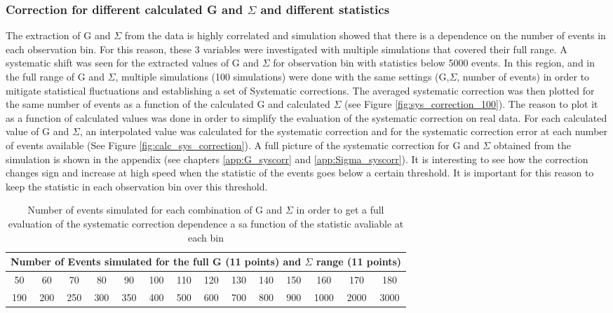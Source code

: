 \subsubsection{Correction for different calculated G and \texorpdfstring{$\Sigma$}{Sigma} and different statistics}
The extraction of G and $\Sigma$ from the data is highly correlated and simulation showed that there is a dependence on the number of events in each observation bin. For this reason, these 3 variables were investigated with multiple simulations that covered their full range. A systematic shift was seen for the extracted values of G and $\Sigma$ for observation bin with statistics below 5000 events. In this region, and in the full range of G and $\Sigma$, multiple simulations (100 simulations) were done with the same settings (G,$\Sigma$, number of events) in order to mitigate statistical fluctuations and establishing a set of Systematic corrections. The averaged systematic correction was then plotted for the same number of events as a function of the calculated G and calculated $\Sigma$ (see Figure \ref{fig:sys_correction_100}). The reason to plot it as a function of calculated values was done in order to simplify the evaluation of the systematic correction on real data. For each calculated value of G and $\Sigma$, an interpolated value was calculated for the systematic correction and for the systematic correction error at each number of events available (See Figure \ref{fig:calc_sys_correction}). A full picture of the systematic correction for G and $\Sigma$ obtained from the simulation is shown in the appendix (see chapters \ref{app:G_syscorr} and \ref{app:Sigma_syscorr}). It is interesting to see how the correction changes sign and increase at high speed when the statistic of the events goes below a certain threshold. It is important for this reason to keep the statistic in each observation bin over this threshold.
\begin{table}
  \begin{center}
    \begin{tabular}{ ||c|c|c|c|c|c|c|c|c|c|c|c|c|c||}
      \hline
      \multicolumn{14}{|c|}{Number of Events simulated for the full G (11 points) and $\Sigma$ range (11 points)  } \\
      \hline
      \hline
      50&60&70&80&90&100&110&120&130&140&150&160&170&180\\
      \hline
      190&200&250&300&350&400&500&600&700&800&900&1000&2000&3000 \\
      \hline
    \end{tabular}
  \end{center}
  \caption{Number of events simulated for each combination of G and $\Sigma$ in order to get a full evaluation of the systematic correction dependence a sa function of the statistic avaliable at each bin}
  \label{table:sim_nevents}
\end{table}


